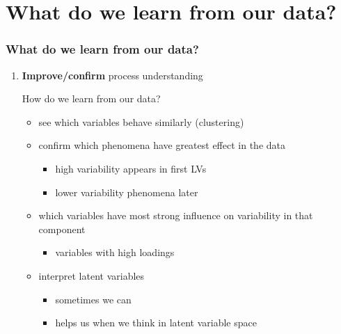\section{What do we learn from our data?}

\begin{frame}\frametitle{What do we learn from our data?}

\begin{enumerate}
	\item {\bf \color{myGreen}Improve/confirm} process understanding
	
		 How do we learn from our data?
\begin{itemize}

	\item	see which variables behave similarly (clustering) \pause
	\item	confirm which phenomena have greatest effect in the data 
	\begin{itemize}
		\item	high variability appears in first LVs
		\item	lower variability phenomena later
	\end{itemize}\pause

	\item	which variables have most strong influence on variability in that component
	\begin{itemize}
		\item variables with high loadings
	\end{itemize}\pause

	\item	interpret latent variables
	\begin{itemize}
		\item	sometimes we can
		\item	helps us when we think in latent variable space
	\end{itemize}
\end{itemize}
\end{enumerate}
\end{frame}

